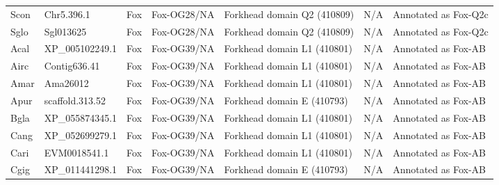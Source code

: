 \documentclass[../main.tex]{subfiles}
\begin{document}
\begin{landscape}
\begin{longtable}{lllllll}
		Scon           & Chr5.396.1            & Fox            & Fox-OG28/NA         & Forkhead domain Q2 (410809)                 & N/A                                                                    & Annotated as Fox-Q2c \\
		Sglo           & Sgl013625             & Fox            & Fox-OG28/NA         & Forkhead domain Q2 (410809)                 & N/A                                                                    & Annotated as Fox-Q2c \\
		Acal           & XP\_005102249.1       & Fox            & Fox-OG39/NA         & Forkhead domain L1 (410801)                 & N/A                                                                    & Annotated as Fox-AB  \\
		Airc           & Contig636.41          & Fox            & Fox-OG39/NA         & Forkhead domain L1 (410801)                 & N/A                                                                    & Annotated as Fox-AB  \\
		Amar           & Ama26012              & Fox            & Fox-OG39/NA         & Forkhead domain L1 (410801)                 & N/A                                                                    & Annotated as Fox-AB  \\
		Apur           & scaffold.313.52       & Fox            & Fox-OG39/NA         & Forkhead domain E (410793)                  & N/A                                                                    & Annotated as Fox-AB  \\
		Bgla           & XP\_055874345.1       & Fox            & Fox-OG39/NA         & Forkhead domain L1 (410801)                 & N/A                                                                    & Annotated as Fox-AB  \\
		Cang           & XP\_052699279.1       & Fox            & Fox-OG39/NA         & Forkhead domain L1 (410801)                 & N/A                                                                    & Annotated as Fox-AB  \\
		Cari           & EVM0018541.1          & Fox            & Fox-OG39/NA         & Forkhead domain L1 (410801)                 & N/A                                                                    & Annotated as Fox-AB  \\
		Cgig           & XP\_011441298.1       & Fox            & Fox-OG39/NA         & Forkhead domain E (410793)                  & N/A                                                                    & Annotated as Fox-AB  \\

\end{longtable}
\end{landscape}
\end{document}
